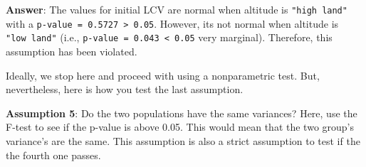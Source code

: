 \documentclass[
]{book}
\newenvironment{Shaded}{\begin{snugshade}}{\end{snugshade}}
\newcommand{\AttributeTok}[1]{\textcolor[rgb]{0.77,0.63,0.00}{#1}}
\newcommand{\CommentTok}[1]{\textcolor[rgb]{0.56,0.35,0.01}{\textit{#1}}}
\newcommand{\FunctionTok}[1]{\textcolor[rgb]{0.00,0.00,0.00}{#1}}
\newcommand{\NormalTok}[1]{#1}
\newcommand{\OtherTok}[1]{\textcolor[rgb]{0.56,0.35,0.01}{#1}}
\newcommand{\SpecialCharTok}[1]{\textcolor[rgb]{0.00,0.00,0.00}{#1}}
\newcommand{\StringTok}[1]{\textcolor[rgb]{0.31,0.60,0.02}{#1}}
\begin{document}
\begin{Shaded}
\end{Shaded}

\textbf{Answer}: The values for initial LCV are normal when altitude is \texttt{"high\ land"} with a \texttt{p-value\ =\ 0.5727\ \textgreater{}\ 0.05}. However, its not normal when altitude is \texttt{"low\ land"} (i.e., \texttt{p-value\ =\ 0.043\ \textless{}\ 0.05} very marginal). Therefore, this assumption has been violated.

Ideally, we stop here and proceed with using a nonparametric test. But, nevertheless, here is how you test the last assumption.

\textbf{Assumption 5}: Do the two populations have the same variances? Here, use the F-test to see if the p-value is above 0.05. This would mean that the two group's variance's are the same. This assumption is also a strict assumption to test if the the fourth one passes.

\begin{Shaded}
\end{Shaded}
\end{document}
